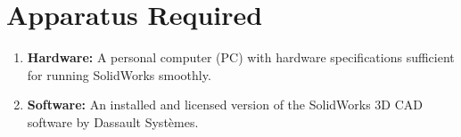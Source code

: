 \section{Apparatus Required}

\begin{enumerate}
  \setlength{\itemsep}{0pt}
        \setlength{\parskip}{0pt}
        \setlength{\parsep}{0pt}
  \item \textbf{Hardware:} A personal computer (PC) with hardware specifications sufficient for running SolidWorks smoothly.
  \item \textbf{Software:} An installed and licensed version of the SolidWorks 3D CAD software by Dassault Systèmes.
\end{enumerate}
